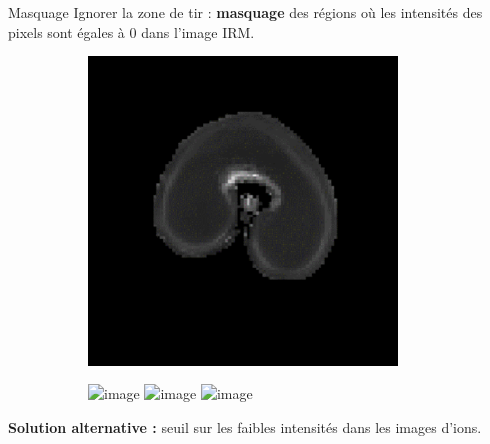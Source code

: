 \documentclass[10pt]{beamer}
\begin{document}
\begin{frame}{Masquage}
  Ignorer la zone de tir : \textbf{masquage} des régions où les intensités des pixels sont égales à 0 dans l'image IRM.

  \begin{figure}[ht]
    \centering
    \begin{subfigure}[t]{0.33\textwidth}
      \centering
      \includegraphics[width=0.9\textwidth]{fig/mri_slice8_250}
      \caption{}
      \label{subfig:mri_slice8_250}
    \end{subfigure}%
    \begin{subfigure}[t]{0.33\textwidth}
      \centering
      \includegraphics<1>[width=0.9\textwidth]{fig/zonetir_0}%
      \includegraphics<2>[width=0.9\textwidth]{fig/zonetir_1}%
      \includegraphics<3->[width=0.9\textwidth]{fig/zonetir_2}
      \caption{}
      \label{subfig:zonetir_0}
    \end{subfigure}%

  \end{figure}

   {
    \textbf{Solution alternative : } seuil sur les faibles intensités dans les images d'ions.
  }
\end{frame}
\end{document}
